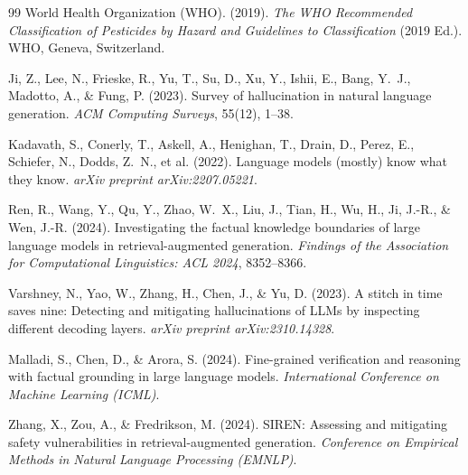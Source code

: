 \documentclass[11pt,a4paper]{article}
\begin{document}
\begin{thebibliography}{99}
 World Health Organization (WHO). (2019). \textit{The WHO Recommended Classification of Pesticides by Hazard and Guidelines to Classification} (2019 Ed.). WHO, Geneva, Switzerland.

 Ji, Z., Lee, N., Frieske, R., Yu, T., Su, D., Xu, Y., Ishii, E., Bang, Y.~J., Madotto, A., \& Fung, P. (2023). Survey of hallucination in natural language generation. \textit{ACM Computing Surveys}, 55(12), 1--38.

 Kadavath, S., Conerly, T., Askell, A., Henighan, T., Drain, D., Perez, E., Schiefer, N., Dodds, Z.~N., et al. (2022). Language models (mostly) know what they know. \textit{arXiv preprint arXiv:2207.05221}.

 Ren, R., Wang, Y., Qu, Y., Zhao, W.~X., Liu, J., Tian, H., Wu, H., Ji, J.-R., \& Wen, J.-R. (2024). Investigating the factual knowledge boundaries of large language models in retrieval-augmented generation. \textit{Findings of the Association for Computational Linguistics: ACL 2024}, 8352--8366.

 Varshney, N., Yao, W., Zhang, H., Chen, J., \& Yu, D. (2023). A stitch in time saves nine: Detecting and mitigating hallucinations of LLMs by inspecting different decoding layers. \textit{arXiv preprint arXiv:2310.14328}.

 Malladi, S., Chen, D., \& Arora, S. (2024). Fine-grained verification and reasoning with factual grounding in large language models. \textit{International Conference on Machine Learning (ICML)}.

 Zhang, X., Zou, A., \& Fredrikson, M. (2024). SIREN: Assessing and mitigating safety vulnerabilities in retrieval-augmented generation. \textit{Conference on Empirical Methods in Natural Language Processing (EMNLP)}.
\end{thebibliography}
\end{document}
